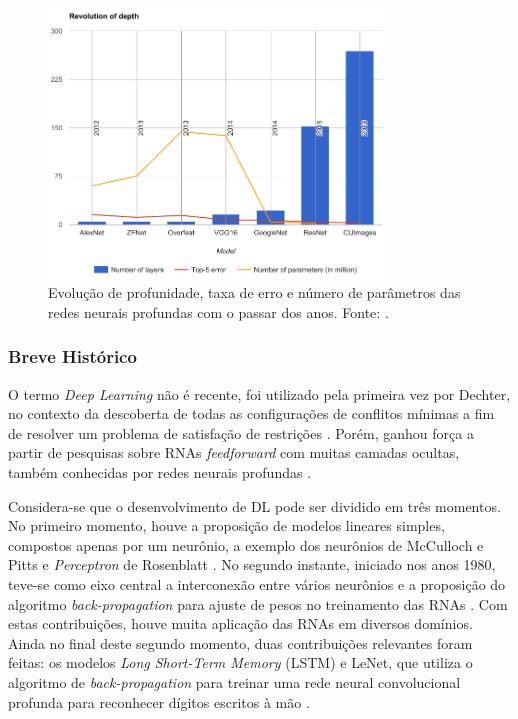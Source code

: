\begin{figure}[ht]
	\centering
	\caption{Evolução de profunidade, taxa de erro e número de parâmetros das redes neurais profundas com o passar dos anos. Fonte: \cite{mediumcnn}.}
	\label{fig:compara_redes}
	\includegraphics[width=0.8\textwidth]{img/compara_redes.png}
\end{figure}

\subsubsection{Breve Histórico}

O termo \emph{Deep Learning} não é recente, foi utilizado pela primeira vez por Dechter, no contexto da descoberta de todas as configurações de conflitos mínimas a fim de resolver um problema de satisfação de restrições \cite{dechter1986learning}. Porém, ganhou força a partir de pesquisas sobre RNAs \emph{feedforward} com muitas camadas ocultas, também conhecidas por redes neurais profundas \cite{deng2014deep}.

Considera-se que o desenvolvimento de DL pode ser dividido em três momentos. No primeiro momento, houve a proposição de modelos lineares simples, compostos apenas por um neurônio, a exemplo dos neurônios de McCulloch e Pitts \cite{mcculloch1943logical} e \emph{Perceptron} de Rosenblatt  \cite{rosenblatt1958perceptron}. No segundo instante, iniciado nos anos 1980, teve-se como eixo central a interconexão entre vários neurônios e a proposição do algoritmo \emph{back-propagation} para ajuste de pesos no treinamento das RNAs \cite{rumelhart1986parallel,rumelhart1986backpropagation}. Com estas contribuições, houve muita aplicação das RNAs em diversos domínios. Ainda no final deste segundo momento, duas contribuições relevantes foram feitas: os modelos \emph{Long Short-Term Memory} (LSTM) e LeNet, que utiliza o algoritmo de \emph{back-propagation} para treinar uma rede neural convolucional profunda para reconhecer dígitos escritos à mão \cite{lenet}.

